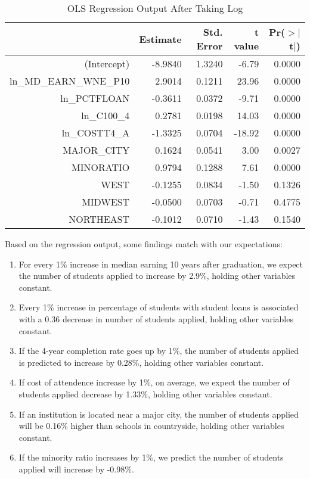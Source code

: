 \documentclass{article}
\begin{document}
\begin{table}[H]
\centering
\begin{tabular}{rrrrr}
  \hline
 & Estimate & Std. Error & t value & Pr($>$$|$t$|$) \\ 
  \hline
(Intercept) & -8.9840 & 1.3240 & -6.79 & 0.0000 \\ 
  ln\_MD\_EARN\_WNE\_P10 & 2.9014 & 0.1211 & 23.96 & 0.0000 \\ 
  ln\_PCTFLOAN & -0.3611 & 0.0372 & -9.71 & 0.0000 \\ 
  ln\_C100\_4 & 0.2781 & 0.0198 & 14.03 & 0.0000 \\ 
  ln\_COSTT4\_A & -1.3325 & 0.0704 & -18.92 & 0.0000 \\ 
  MAJOR\_CITY & 0.1624 & 0.0541 & 3.00 & 0.0027 \\ 
  MINORATIO & 0.9794 & 0.1288 & 7.61 & 0.0000 \\ 
  WEST & -0.1255 & 0.0834 & -1.50 & 0.1326 \\ 
  MIDWEST & -0.0500 & 0.0703 & -0.71 & 0.4775 \\ 
  NORTHEAST & -0.1012 & 0.0710 & -1.43 & 0.1540 \\ 
   \hline
\end{tabular}
\caption{OLS Regression Output After Taking Log} 
\end{table}
Based on the regression output, some findings match with our expectations:
\begin{enumerate}
  \item For every 1\% increase in median earning 10 years after graduation, we expect the number of students applied to  increase by 2.9\%, holding other variables constant.

  \item Every 1\% increase in percentage of students with student loans is associated with a 0.36 decrease in number of students applied, holding other variables constant.

  \item If the 4-year completion rate goes up by 1\%, the number of students applied is predicted to increase by 0.28\%, holding other variables constant.

  \item If cost of attendence increase by 1\%, on average, we expect the number of students applied decrease by 1.33\%, holding other variables constant.

  \item If an institution is located near a major city, the number of students applied will be 0.16\% higher than schools in countryside, holding other variables constant.

  \item If the minority ratio increases by 1\%, we predict the number of students applied will increase by -0.98\%.
\end{enumerate}
\end{document}
